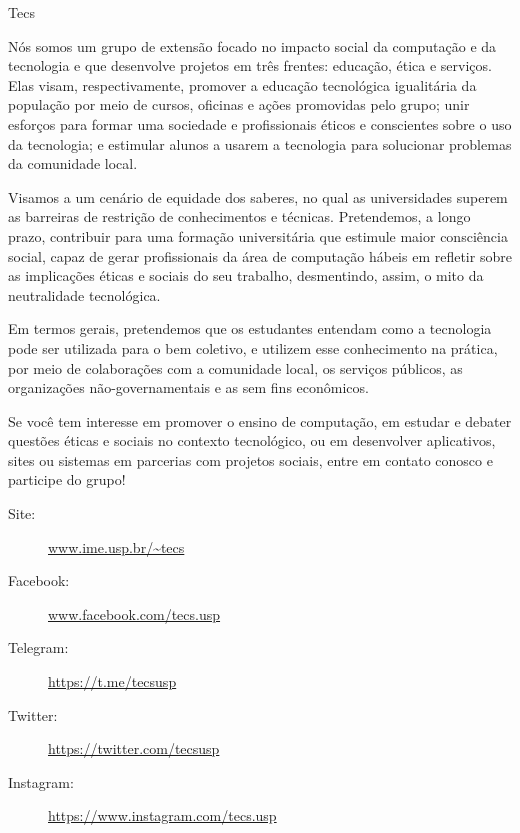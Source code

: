 
\begin{subsecao}{Tecs}


Nós somos um grupo de extensão focado no impacto social da computação e da 
tecnologia e que desenvolve projetos em três frentes: educação, ética e 
serviços. Elas visam, respectivamente, promover a educação tecnológica 
igualitária da população por meio de cursos, oficinas e ações promovidas pelo 
grupo; unir esforços para formar uma sociedade e profissionais éticos e
conscientes sobre o uso da tecnologia; e estimular alunos a usarem a tecnologia 
para solucionar problemas da comunidade local.

Visamos a um cenário de equidade dos saberes, no qual as universidades superem
as barreiras de restrição de conhecimentos e técnicas. Pretendemos, a longo prazo,
contribuir para uma formação universitária que estimule maior consciência social, 
capaz de gerar profissionais da área de computação hábeis em refletir sobre as 
implicações éticas e sociais do seu trabalho, desmentindo, assim, o mito da 
neutralidade tecnológica.

Em termos gerais, pretendemos que os estudantes entendam como a tecnologia pode
ser utilizada para o bem coletivo, e utilizem esse conhecimento na prática, por
meio de colaborações com a comunidade local, os serviços públicos, as
organizações não-governamentais e as sem fins econômicos. 

Se você tem interesse em promover o ensino de computação, em estudar e debater 
questões éticas e sociais no contexto tecnológico, ou em desenvolver aplicativos,
sites ou sistemas em parcerias com projetos sociais, entre em contato conosco e 
participe do grupo!

\vspace{-1em}
\begin{description}
  \item[Site:] \url{www.ime.usp.br/~tecs}
  \item[Facebook:] \url{www.facebook.com/tecs.usp}
  \item[Telegram:] \url{https://t.me/tecsusp}
  \item[Twitter:] \url{https://twitter.com/tecsusp}
  \item[Instagram:] \url{https://www.instagram.com/tecs.usp} 
\end{description}

\end{subsecao}
